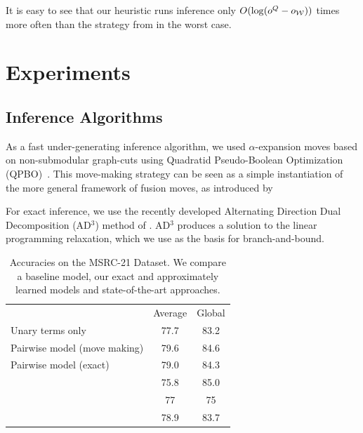 It is easy to see that our heuristic runs inference only $O(\log(o^Q -
o_{\mathcal{W}}))$ times more often than the strategy from \citet{joachims2009cutting} in the
worst case.


\section{Experiments}

\subsection{Inference Algorithms}

As a fast under-generating inference algorithm, we used $\alpha$-expansion
moves based on non-submodular graph-cuts using Quadratid Pseudo-Boolean
Optimization (QPBO)~\citep{rother2007optimizing}.  This move-making strategy
can be seen as a simple instantiation of the more general framework of fusion
moves, as introduced by \citet{lempitsky2010fusion}

For exact inference, we use the recently developed Alternating Direction Dual
Decomposition (AD$^3$) method of \citet{martins2011augmented}. AD$^3$ produces
a solution to the linear programming relaxation, which we use as the basis for
branch-and-bound.

\begin{table}
    \begin{center}
    \begin{tabularx}{\linewidth}{@{\extracolsep{\fill}}lcc}
        \toprule
                    & Average & Global \\
        \cmidrule{1-3}
    Unary terms only & 77.7& 83.2 \\
    Pairwise model (move making)& 79.6&84.6\\
    Pairwise model (exact)& 79.0 & 84.3\\
        \cmidrule{1-3}
    \citet{ladicky2009associative} & 75.8& 85.0\\
    \citet{gonfaus2010harmony} & 77&  75\\
    \citet{lucchi2013learning} & 78.9& 83.7\\
    \bottomrule
    \end{tabularx}
    \end{center}
    \caption{Accuracies on the MSRC-21 Dataset.  We compare a baseline model,
    our exact and approximately learned models and state-of-the-art
    approaches.\label{msrcacc}}
    
\end{table}


